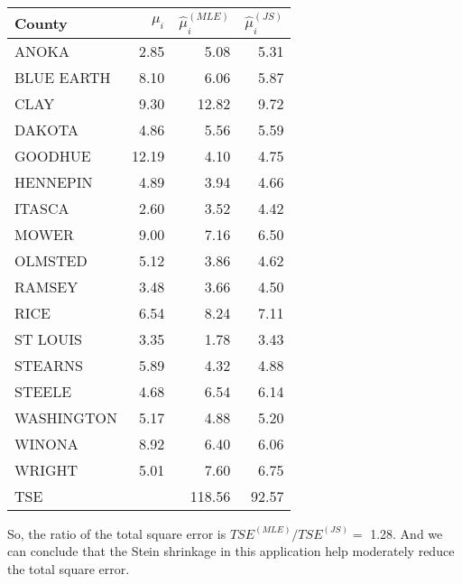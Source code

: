 \documentclass{article}\usepackage{graphicx, color}
\begin{document}
\begin{center}
\begin{tabular}{lr|rr} \hline
County & $\mu_i$ & $\hat{\mu}_i^{(MLE)}$ & $\hat{\mu}_i^{(JS)}$ \\ \hline
ANOKA                & 2.85 & 5.08 & 5.31\\
BLUE EARTH           & 8.10 & 6.06 & 5.87\\
CLAY                 & 9.30 & 12.82 & 9.72\\
DAKOTA               & 4.86 & 5.56 & 5.59\\
GOODHUE              & 12.19 & 4.10 & 4.75\\
HENNEPIN             & 4.89 & 3.94 & 4.66\\
ITASCA               & 2.60 & 3.52 & 4.42\\
MOWER                & 9.00 & 7.16 & 6.50\\
OLMSTED              & 5.12 & 3.86 & 4.62\\
RAMSEY               & 3.48 & 3.66 & 4.50\\
RICE                 & 6.54 & 8.24 & 7.11\\
ST LOUIS             & 3.35 & 1.78 & 3.43\\
STEARNS              & 5.89 & 4.32 & 4.88\\
STEELE               & 4.68 & 6.54 & 6.14\\
WASHINGTON           & 5.17 & 4.88 & 5.20\\
WINONA               & 8.92 & 6.40 & 6.06\\
WRIGHT               & 5.01 & 7.60 & 6.75\\ \hline
TSE &  & 118.56 & 92.57 
\end{tabular}
\end{center}
So, the ratio of the total square error is $TSE^{(MLE)} / TSE^{(JS)} =$ 1.28.
And we can conclude that the Stein shrinkage in this application help moderately
reduce the total square error.
\end{document}
